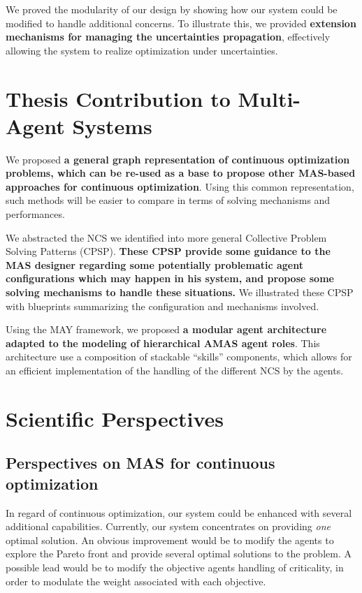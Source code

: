 We proved the modularity of our design by showing how our system could be modified to handle additional concerns. To illustrate this, we provided \textbf{extension mechanisms for managing the uncertainties propagation}, effectively allowing the system to realize optimization under uncertainties.

\section*{Thesis Contribution to Multi-Agent Systems}

We proposed \textbf{a general graph representation of continuous optimization problems, which can be re-used as a base to propose other MAS-based approaches for continuous optimization}. Using this common representation, such methods will be easier to compare in terms of solving mechanisms and performances.

We abstracted the NCS we identified into more general Collective Problem Solving Patterns (CPSP). \textbf{These CPSP provide some guidance to the MAS designer regarding some potentially problematic agent configurations which may happen in his system, and propose some solving mechanisms to handle these situations.} We illustrated these CPSP with blueprints summarizing the configuration and mechanisms involved.

Using the MAY framework, we proposed \textbf{a modular agent architecture adapted to the modeling of hierarchical AMAS agent roles}. This architecture use a composition of stackable \enquote{skills} components, which allows for an efficient implementation of the handling of the different NCS by the agents.

\section*{Scientific Perspectives}

\subsection*{Perspectives on MAS for continuous optimization}

In regard of continuous optimization, our system could be enhanced with several additional capabilities. Currently, our system concentrates on providing \emph{one} optimal solution. An obvious improvement would be to modify the agents to explore the Pareto front and provide several optimal solutions to the problem. A possible lead would be to modify the objective agents handling of criticality, in order to modulate the weight associated with each objective.

